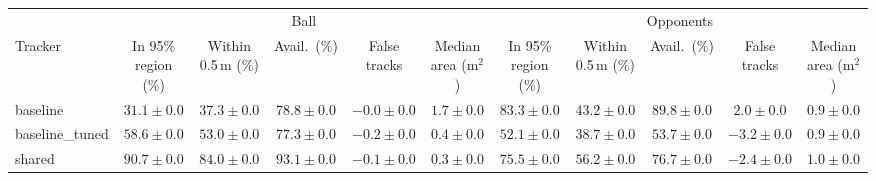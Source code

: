 \begin{tabular}{lcccccccccc}
\toprule
 & \multicolumn{5}{c}{Ball} & \multicolumn{5}{c}{Opponents} \\
\cmidrule(lr){2-6}\cmidrule(lr){7-11}
Tracker & In 95\% region (\%) & Within 0.5\,m (\%) & Avail.\ (\%) & False tracks & Median area (m$^2$) & In 95\% region (\%) & Within 0.5\,m (\%) & Avail.\ (\%) & False tracks & Median area (m$^2$) \\
\midrule
baseline & $31.1 \pm 0.0$ & $37.3 \pm 0.0$ & $78.8 \pm 0.0$ & $-0.0 \pm 0.0$ & $1.7 \pm 0.0$ & $83.3 \pm 0.0$ & $43.2 \pm 0.0$ & $89.8 \pm 0.0$ & $2.0 \pm 0.0$ & $0.9 \pm 0.0$ \\
baseline\_tuned & $58.6 \pm 0.0$ & $53.0 \pm 0.0$ & $77.3 \pm 0.0$ & $-0.2 \pm 0.0$ & $0.4 \pm 0.0$ & $52.1 \pm 0.0$ & $38.7 \pm 0.0$ & $53.7 \pm 0.0$ & $-3.2 \pm 0.0$ & $0.9 \pm 0.0$ \\
shared & $90.7 \pm 0.0$ & $84.0 \pm 0.0$ & $93.1 \pm 0.0$ & $-0.1 \pm 0.0$ & $0.3 \pm 0.0$ & $75.5 \pm 0.0$ & $56.2 \pm 0.0$ & $76.7 \pm 0.0$ & $-2.4 \pm 0.0$ & $1.0 \pm 0.0$ \\
\bottomrule
\end{tabular}
